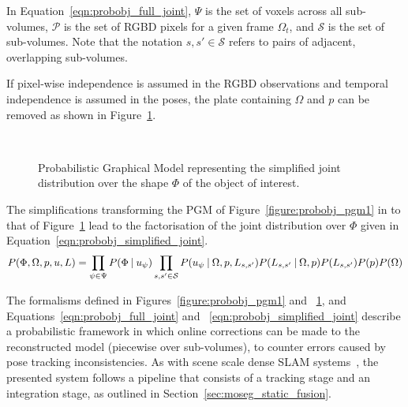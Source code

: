 In Equation~\ref{eqn:probobj_full_joint}, \( \Psi \) is the set of voxels
across all sub-volumes, \(\mathcal{P}\) is the set of RGBD pixels for a given 
frame \(\Omega_{t}\), and \(\mathcal{S}\) is the set of sub-volumes. Note that the 
notation \(s, s' \in \mathcal{S}\) refers to pairs of adjacent, overlapping 
sub-volumes.

If pixel-wise independence is assumed in the RGBD observations and temporal
independence is assumed in the poses, the plate containing \( \Omega \) and \(p\) can
be removed as shown in Figure~\ref{figure:probobj_pgm2}.
\begin{figure}[!htbp]
  \centering
  \caption[Probabilistic Object Reconstruction Formulation II]
  {Probabilistic Graphical Model representing the simplified joint
    distribution over the shape \( \Phi \) of the object of interest.}
~\label{figure:probobj_pgm2}
\end{figure}

The simplifications transforming the PGM of Figure~\ref{figure:probobj_pgm1} in to
that of Figure~\ref{figure:probobj_pgm2} lead to the factorisation of the
joint distribution over \( \Phi \) given in Equation~\ref{eqn:probobj_simplified_joint}.
\begin{equation}
  \label{eqn:probobj_simplified_joint}
  P(\Phi, \Omega, p, u, L) = 
  \prod_{\psi \in \Psi}P(\Phi \:\vert\: u_{\psi})
  \prod_{s, s' \in \mathcal{S}}P(u_{\psi} \:\vert\: \Omega, p, L_{s, s'})
  P(L_{s, s'} \:\vert\: \Omega, p) P(L_{s, s'})P(p)P(\Omega)
\end{equation}

The formalisms defined in Figures~\ref{figure:probobj_pgm1} and
~\ref{figure:probobj_pgm2}, and Equations~\ref{eqn:probobj_full_joint} and
~\ref{eqn:probobj_simplified_joint} describe a probabilistic framework in which
online corrections can be made to the reconstructed model (piecewise over
sub-volumes), to counter errors caused by pose tracking inconsistencies. As with
scene scale dense SLAM systems~\cite{Newcombe2011, Prisacariu2014, NieBner2013},
the presented system follows a pipeline that consists of a tracking stage and an
integration stage, as outlined in Section~\ref{sec:moseg_static_fusion}.

